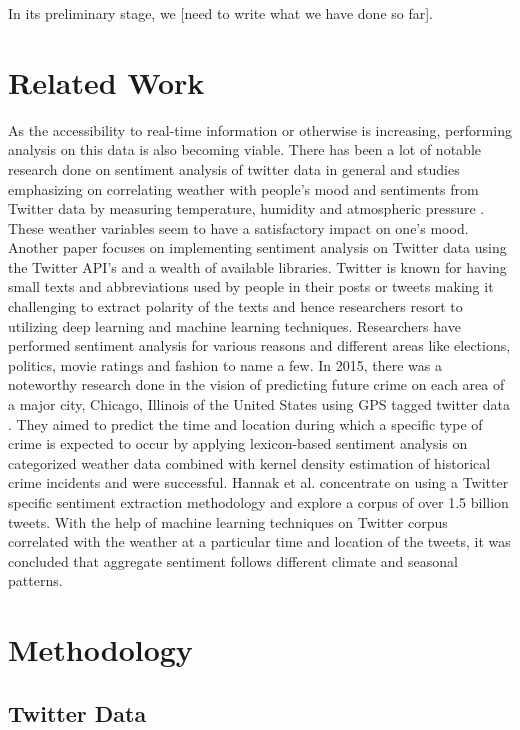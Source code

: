 \documentclass[a4paper,10pt]{article}
\begin{document}
    In its preliminary stage, we [need to write what we have done so far].

    \section{Related Work}

    As the accessibility to real-time information or otherwise is increasing, performing analysis on this data is also becoming viable. There has been a lot of notable research done on sentiment analysis of twitter data in general and studies emphasizing on correlating weather with people’s mood and sentiments from Twitter data by measuring temperature, humidity and atmospheric pressure . These weather variables seem to have a satisfactory impact on one’s mood. Another paper  focuses on implementing sentiment analysis on Twitter data using the Twitter API’s and a wealth of available libraries. Twitter is known for having small texts and abbreviations used by people in their posts or tweets making it challenging to extract polarity of the texts and hence researchers resort to utilizing deep learning and machine learning techniques.
    Researchers have performed sentiment analysis for various reasons and different areas like elections, politics, movie ratings and fashion to name a few. In 2015, there was a noteworthy research done in the vision of predicting future crime on each area of a major city, Chicago, Illinois of the United States using GPS tagged twitter data . They aimed to predict the time and location during which a specific type of crime is expected to occur by applying lexicon-based sentiment analysis on categorized weather data combined with kernel density estimation of historical crime incidents and were successful. Hannak et al.  concentrate on using a Twitter specific sentiment extraction methodology and explore a corpus of over 1.5 billion tweets. With the help of machine learning techniques on Twitter corpus correlated with the weather at a particular time and location of the tweets, it was concluded that aggregate sentiment follows different climate and seasonal patterns.

    \section{Methodology}

    \subsection{Twitter Data}
\end{document}
